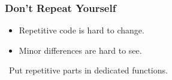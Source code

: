 \begin{frame}

\frametitle{Don't Repeat Yourself}

\begin{itemize}

\item Repetitive code is hard to change.

\item Minor differences are hard to see.

\end{itemize}

\vspace{\fill}

\begin{center}

\leftthumbsup~Put repetitive parts in dedicated functions.~\rightthumbsup

\end{center}

\vspace{\fill}

\end{frame}

